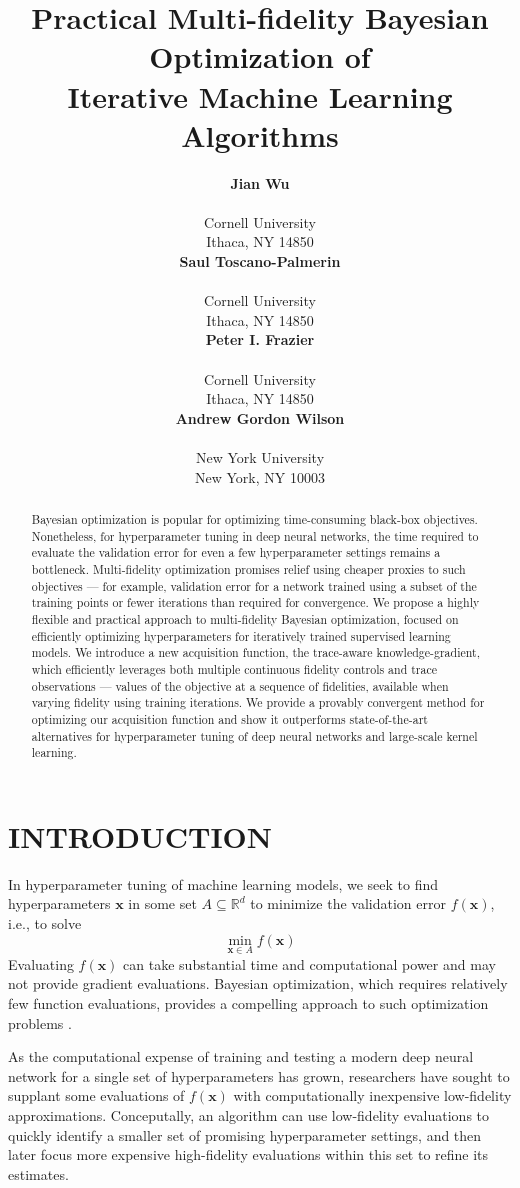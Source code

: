 \documentclass[letterpaper]{article}
\title{Practical Multi-fidelity Bayesian Optimization of \\Iterative Machine Learning Algorithms}
\author{ {\bf Jian Wu}\\
\orie \\
Cornell University\\
Ithaca, NY 14850 \\
\And
{\bf Saul Toscano-Palmerin}  \\
\orie \\
Cornell University\\
Ithaca, NY 14850 \\
\And
{\bf Peter I. Frazier}   \\
\orie \\
Cornell University\\
Ithaca, NY 14850 \\
\And
{\bf Andrew Gordon Wilson}\\
\courant\\
New York University\\
New York, NY 10003
}
\newcommand{\x}{\mathbf{x}}
\numberwithin{equation}{section}
\begin{document}
\maketitle

\begin{abstract}
Bayesian optimization is popular for optimizing time-consuming black-box objectives.
Nonetheless, for hyperparameter tuning in deep neural networks,
the time required to evaluate the validation error for even a few hyperparameter settings remains a bottleneck.
Multi-fidelity optimization promises relief using cheaper proxies to such objectives ---  for example, validation error for a network trained using a subset of the training points or fewer iterations than required for convergence.
We propose a highly flexible and practical approach to multi-fidelity Bayesian optimization, 
focused on efficiently optimizing hyperparameters for iteratively trained supervised learning models.
We introduce a new acquisition function, the trace-aware knowledge-gradient, which efficiently leverages both multiple continuous fidelity controls and trace observations --- values of the objective at a sequence of fidelities, available when varying fidelity using training iterations. 
We provide a provably convergent method for optimizing our acquisition function
and show it outperforms state-of-the-art alternatives for  hyperparameter tuning of deep neural networks and large-scale kernel learning. 
\end{abstract}

\section{INTRODUCTION}
In hyperparameter tuning of machine learning models, we seek to find hyperparameters $\x$ in some set $A \subseteq \mathbb{R}^d$ to minimize the validation error $f(\x)$, i.e., to solve
\begin{equation}
\min_{\x\in A} f(\x)
\label{eqn:min_f}
\end{equation}
Evaluating $f(\x)$ can take substantial time and computational power \citep{bergstra2012random}
and may not provide gradient evaluations. Bayesian optimization, which requires relatively few 
function evaluations, provides a compelling approach to such optimization problems \citep{jones1998efficient, snoek2012practical}.

As the computational expense of training and testing a modern deep neural network for a single set of hyperparameters has grown, researchers have sought to supplant some evaluations of $f(\x)$ with computationally inexpensive low-fidelity approximations.  
Conceputally, an algorithm can use low-fidelity evaluations to quickly identify a smaller set of promising hyperparameter settings, and then later focus more expensive high-fidelity evaluations within this set to refine its estimates.
\end{document}
